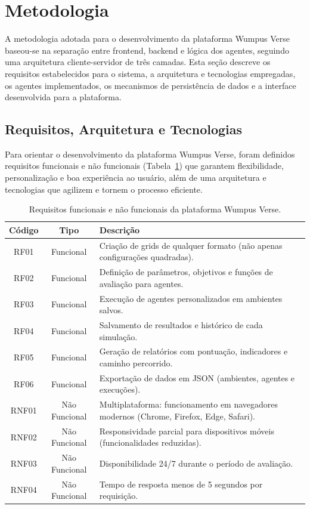 \section{Metodologia}

A metodologia adotada para o desenvolvimento da plataforma Wumpus Verse baseou-se na separação entre frontend, backend e lógica dos agentes, seguindo uma arquitetura cliente-servidor de três camadas. Esta seção descreve os requisitos estabelecidos para o sistema, a arquitetura e tecnologias empregadas, os agentes implementados, os mecanismos de persistência de dados e a interface desenvolvida para a plataforma.

\subsection{Requisitos, Arquitetura e Tecnologias} \label{sec:req-arq-tec}

Para orientar o desenvolvimento da plataforma Wumpus Verse, foram definidos requisitos funcionais e não funcionais (Tabela~\ref{tab:requisitos}) que garantem flexibilidade, personalização e boa experiência ao usuário, além de uma arquitetura e tecnologias que agilizem e tornem o processo eficiente.

\begin{table}[ht]
    \centering
    \small
    \begin{tabular}{|c|c|p{6.5cm}|}
        \hline
        \textbf{Código} & \textbf{Tipo} & \textbf{Descrição} \\
        \hline
        RF01 & Funcional & Criação de grids de qualquer formato (não apenas configurações quadradas). \\
        RF02 & Funcional & Definição de parâmetros, objetivos e funções de avaliação para agentes. \\
        RF03 & Funcional & Execução de agentes personalizados em ambientes salvos. \\
        RF04 & Funcional & Salvamento de resultados e histórico de cada simulação. \\
        RF05 & Funcional & Geração de relatórios com pontuação, indicadores e caminho percorrido. \\
        RF06 & Funcional & Exportação de dados em JSON (ambientes, agentes e execuções). \\
        \hline
        RNF01 & Não Funcional & Multiplataforma: funcionamento em navegadores modernos (Chrome, Firefox, Edge, Safari). \\
        RNF02 & Não Funcional & Responsividade parcial para dispositivos móveis (funcionalidades reduzidas). \\
        RNF03 & Não Funcional & Disponibilidade 24/7 durante o período de avaliação. \\
        RNF04 & Não Funcional & Tempo de resposta menos de 5 segundos por requisição. \\
        \hline
    \end{tabular}
    \caption{Requisitos funcionais e não funcionais da plataforma Wumpus Verse.}
    \label{tab:requisitos}
\end{table}

